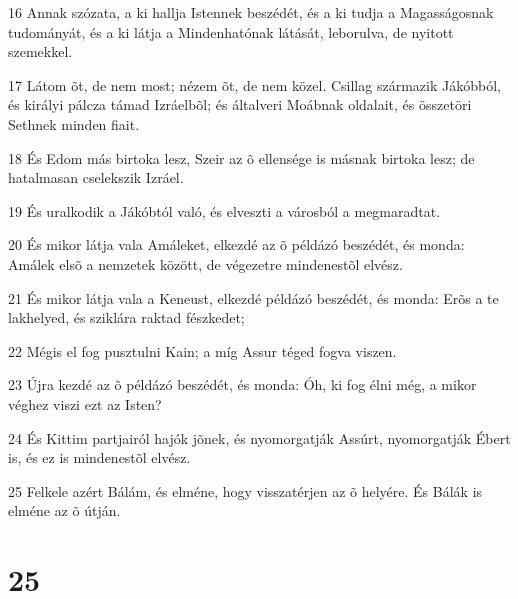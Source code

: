 \par 16 Annak szózata, a ki hallja Istennek beszédét, és a ki tudja a Magasságosnak tudományát, és a ki látja a Mindenhatónak látását, leborulva, de nyitott szemekkel.
\par 17 Látom õt, de nem most; nézem õt, de nem közel. Csillag származik Jákóbból, és királyi pálcza támad Izráelbõl; és általveri Moábnak oldalait, és összetöri Sethnek minden fiait.
\par 18 És Edom más birtoka lesz, Szeir az õ ellensége is másnak birtoka lesz; de hatalmasan cselekszik Izráel.
\par 19 És uralkodik a Jákóbtól való, és elveszti a városból a megmaradtat.
\par 20 És mikor látja vala Amáleket, elkezdé az õ példázó beszédét, és monda: Amálek elsõ a nemzetek között, de végezetre mindenestõl elvész.
\par 21 És mikor látja vala a Keneust, elkezdé példázó beszédét, és monda: Erõs a te lakhelyed, és sziklára raktad fészkedet;
\par 22 Mégis el fog pusztulni Kain; a míg Assur téged fogva viszen.
\par 23 Újra kezdé az õ példázó beszédét, és monda: Óh, ki fog élni még, a mikor véghez viszi ezt az Isten?
\par 24 És Kittim partjairól hajók jõnek, és nyomorgatják Assúrt, nyomorgatják Ébert is, és ez is mindenestõl elvész.
\par 25 Felkele azért Bálám, és elméne, hogy visszatérjen az õ helyére. És Bálák is elméne az õ útján.

\chapter{25}

